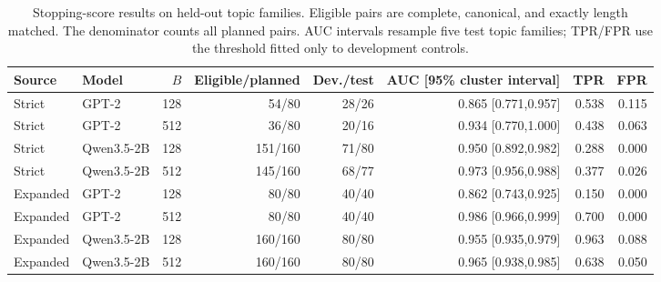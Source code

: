 \begin{table}[t]
\centering
\caption{Stopping-score results on held-out topic families. Eligible pairs are complete, canonical, and exactly length matched. The denominator counts all planned pairs. AUC intervals resample five test topic families; TPR/FPR use the threshold fitted only to development controls.}
\label{tab:stopping-llm}
\begin{tabular}{llrrrrrr}
\toprule
Source & Model & $B$ & Eligible/planned & Dev./test & AUC [95\% cluster interval] & TPR & FPR \\
\midrule
Strict & GPT-2 & 128 & 54/80 & 28/26 & 0.865 [0.771,0.957] & 0.538 & 0.115 \\
Strict & GPT-2 & 512 & 36/80 & 20/16 & 0.934 [0.770,1.000] & 0.438 & 0.063 \\
Strict & Qwen3.5-2B & 128 & 151/160 & 71/80 & 0.950 [0.892,0.982] & 0.288 & 0.000 \\
Strict & Qwen3.5-2B & 512 & 145/160 & 68/77 & 0.973 [0.956,0.988] & 0.377 & 0.026 \\
Expanded & GPT-2 & 128 & 80/80 & 40/40 & 0.862 [0.743,0.925] & 0.150 & 0.000 \\
Expanded & GPT-2 & 512 & 80/80 & 40/40 & 0.986 [0.966,0.999] & 0.700 & 0.000 \\
Expanded & Qwen3.5-2B & 128 & 160/160 & 80/80 & 0.955 [0.935,0.979] & 0.963 & 0.088 \\
Expanded & Qwen3.5-2B & 512 & 160/160 & 80/80 & 0.965 [0.938,0.985] & 0.638 & 0.050 \\
\bottomrule
\end{tabular}
\end{table}
